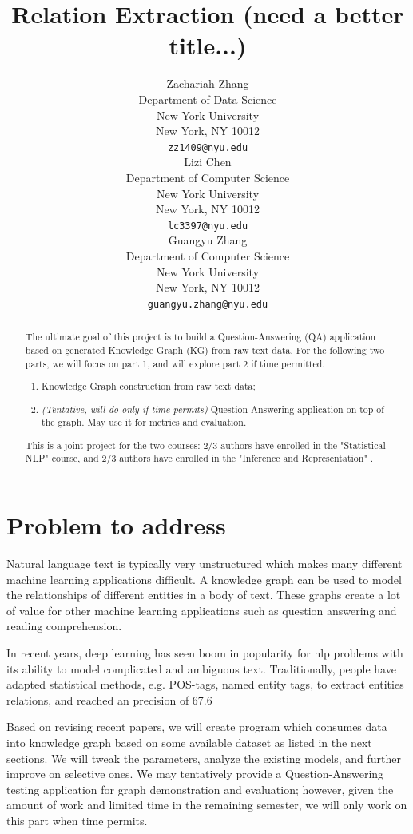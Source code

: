 \documentclass{article}
\title{Relation Extraction (need a better title...)}
\author{
  Zachariah Zhang\\
  Department of Data Science\\
  New York University\\
  New York, NY 10012 \\
  \texttt{zz1409@nyu.edu} \\
  \And
  Lizi Chen\\
  Department of Computer Science\\
  New York University\\
  New York, NY 10012 \\
  \texttt{lc3397@nyu.edu} \\
  \And
  Guangyu Zhang\\
  Department of Computer Science\\
  New York University\\
  New York, NY 10012 \\
  \texttt{guangyu.zhang@nyu.edu} \\
}
\begin{document}

\maketitle

\begin{abstract}
	The ultimate goal of this project is to build a Question-Answering (QA) application based on generated Knowledge Graph (KG) from raw text data. For the following two parts, we will focus on part 1, and will explore part 2 if time permitted.
	 \begin{enumerate}
	 	\item Knowledge Graph construction from raw text data;
	 	\item \emph{(Tentative, will do only if time permits)} Question-Answering application on top of the graph. May use it for metrics and evaluation.
 	\end{enumerate}
 
	This is a joint project for the two courses: 2/3 authors have enrolled in the "Statistical NLP" course, and 2/3 authors have enrolled in the "Inference and Representation" .
\end{abstract}


\section{Problem to address}

	Natural language text is typically very unstructured which makes many different machine learning applications difficult. A knowledge graph can be used to model the relationships of different entities in a body of text. These graphs create a lot of value for other machine learning applications such as question answering and reading comprehension. 
	
	In recent years, deep learning has seen boom in popularity for nlp problems with its ability to model complicated and ambiguous text. Traditionally, people have adapted statistical methods, e.g. POS-tags, named entity tags, to extract entities relations, and reached an precision of 67.6%
	
	Based on revising recent papers, we will create program which consumes data into knowledge graph based on some available dataset as listed in the next sections. We will tweak the parameters, analyze the existing models, and further improve on selective ones. We may tentatively provide a Question-Answering testing application for graph demonstration and evaluation; however, given the amount of work and limited time in the remaining semester, we will only work on this part when time permits.
  
\end{document}
